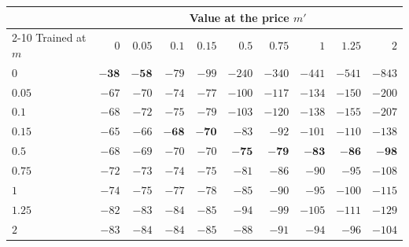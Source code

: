 \begin{tabular}{lrrrrrrrrr}
\toprule
 & \multicolumn{9}{c}{Value at the price $m'$} \\
\cmidrule(lr){2-10}
Trained at $m$ & $0$ & $0.05$ & $0.1$ & $0.15$ & $0.5$ & $0.75$ & $1$ & $1.25$ & $2$ \\
\midrule
$0$ & $\mathbf{-38}$ & $\mathbf{-58}$ & $-79$ & $-99$ & $-240$ & $-340$ & $-441$ & $-541$ & $-843$ \\
$0.05$ & $-67$ & $-70$ & $-74$ & $-77$ & $-100$ & $-117$ & $-134$ & $-150$ & $-200$ \\
$0.1$ & $-68$ & $-72$ & $-75$ & $-79$ & $-103$ & $-120$ & $-138$ & $-155$ & $-207$ \\
$0.15$ & $-65$ & $-66$ & $\mathbf{-68}$ & $\mathbf{-70}$ & $-83$ & $-92$ & $-101$ & $-110$ & $-138$ \\
$0.5$ & $-68$ & $-69$ & $-70$ & $-70$ & $\mathbf{-75}$ & $\mathbf{-79}$ & $\mathbf{-83}$ & $\mathbf{-86}$ & $\mathbf{-98}$ \\
$0.75$ & $-72$ & $-73$ & $-74$ & $-75$ & $-81$ & $-86$ & $-90$ & $-95$ & $-108$ \\
$1$ & $-74$ & $-75$ & $-77$ & $-78$ & $-85$ & $-90$ & $-95$ & $-100$ & $-115$ \\
$1.25$ & $-82$ & $-83$ & $-84$ & $-85$ & $-94$ & $-99$ & $-105$ & $-111$ & $-129$ \\
$2$ & $-83$ & $-84$ & $-84$ & $-85$ & $-88$ & $-91$ & $-94$ & $-96$ & $-104$ \\
\bottomrule
\end{tabular}
